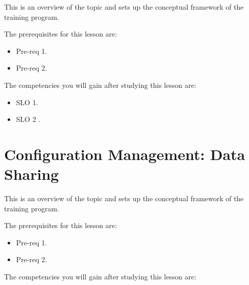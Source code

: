 This is an overview of the topic and sets up the conceptual framework of the training program.




The prerequisites for this lesson are: 




\begin{itemize}
    \item Pre-req 1.
\end{itemize}

\begin{itemize}
    \item Pre-req 2.
\end{itemize}




The competencies you will gain after studying this lesson are: 




\begin{itemize}
    \item SLO 1.
\end{itemize}

\begin{itemize}
    \item SLO 2 .
\end{itemize}

\section{Configuration Management: Data Sharing}
\label{sec:configuration-management-data-sharing}

This is an overview of the topic and sets up the conceptual framework of the training program.




The prerequisites for this lesson are: 




\begin{itemize}
    \item Pre-req 1.
\end{itemize}

\begin{itemize}
    \item Pre-req 2.
\end{itemize}




The competencies you will gain after studying this lesson are: 




